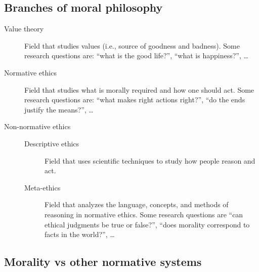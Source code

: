 \subsection{Branches of moral philosophy}

\begin{description}
    \item[Value theory] 
        Field that studies values (i.e., source of goodness and badness). Some research questions are: ``what is the good life?'', ``what is happiness?'', \dots

    \item[Normative ethics] 
        Field that studies what is morally required and how one should act. Some research questions are: ``what makes right actions right?'', ``do the ends justify the means?'', \dots

    \item[Non-normative ethics] \phantom{}
        \begin{description}
            \item[Descriptive ethics] 
                Field that uses scientific techniques to study how people reason and act.

            \item[Meta-ethics] 
                Field that analyzes the language, concepts, and methods of reasoning in normative ethics. Some research questions are ``can ethical judgments be true or false?'', ``does morality correspond to facts in the world?'', \dots
        \end{description}
\end{description}


\subsection{Morality vs other normative systems} \label{sec:morality_other_systems}

